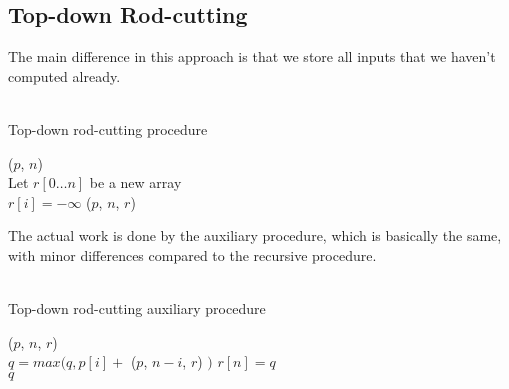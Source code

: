 \subsection{Top-down Rod-cutting}
The main difference in this approach is that we store all inputs that we
haven't computed already. \\\\
\begin{algorithm}[H]
	\caption{Top-down rod-cutting procedure}
	\label{alg:cut-rod|type:memoized}
	
	
	
	
	\BlankLine
	\MemoizedCutRod($p$, $n$) \\
	\Begin
	{
		Let $r[0 \dots n]$ be a new array \\
		{
			$r[i] = -\infty$
		}
		\Return \MemoizedCutRodAux($p$, $n$, $r$)
	}
\end{algorithm}
The actual work is done by the auxiliary procedure, which is basically the
same, with minor differences compared to the recursive procedure. \\\\
\begin{algorithm}[H]
	\caption{Top-down rod-cutting auxiliary procedure}
	\label{alg:cut-rod|type:auxiliary}
	
	
	
	
	\BlankLine
	\MemoizedCutRodAux($p$, $n$, $r$) \\
	\Begin
	{
		{
			$q = max(q, p[i] + $ \MemoizedCutRodAux($p$, $n-i$, $r$) $)$
		}
		$r[n] = q$ \\
		\Return $q$
	}
\end{algorithm}

